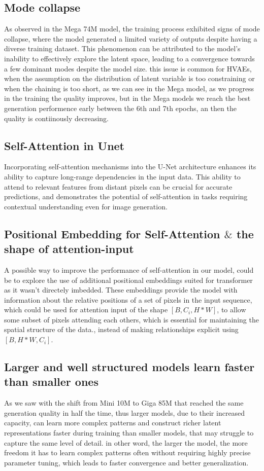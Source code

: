 \documentclass[twocolumn,superscriptaddress,aps]{revtex4-1}
\begin{document}
\subsection{Mode collapse}
As observed in the Mega 74M model, the training process exhibited signs of mode collapse, where the model generated a limited variety of outputs despite having a diverse training dataset. This phenomenon can be attributed to the model's inability to effectively explore the latent space, leading to a convergence towards a few dominant modes despite the model size.
this issue is common for HVAEs, when the assumption on the distribution of latent variable is too constraining or when the chaining is too short, as we can see in the Mega model, as we progress in the training the quality improves, but in the Mega models we reach the best generation performence early between the 6th and 7th epochs, an then the quality is contiinously decreasing.

\subsection{Self-Attention in Unet}
Incorporating self-attention mechanisms into the U-Net architecture enhances its ability to capture long-range dependencies in the input data. This ability to attend to relevant features from distant pixels can be crucial for accurate predictions, and demonstrates the potential of self-attention in tasks requiring contextual understanding even for image generation.

\subsection{Positional Embedding for Self-Attention $\&$ the shape of attention-input}
A possible way to improve the performance of self-attention in our model, could be to explore the use of additional positional embeddings suited for transformer as it wasn't directely imbedded. These embeddings provide the model with information about the relative positions of a set of pixels in the input sequence, which could be used for attention input of the shape $[B, C_i, H*W]$, to allow some subset of pixels attending each others, which is essential for maintaining the spatial structure of the data., instead of making relationships explicit using $[B, H*W, C_i]$.

\subsection{Larger and well structured models learn faster than smaller ones}
As we saw with the shift from Mini 10M to Giga 85M that reached the same generation quality in half the time, thus larger models, due to their increased capacity, can learn more complex patterns and construct richer latent representations faster during training than smaller models, that may struggle to capture the same level of detail. in other word, the larger the model, the more freedom it has to learn complex patterns often without requiring highly precise parameter tuning, which leads to faster convergence and better generalization.
\end{document}

